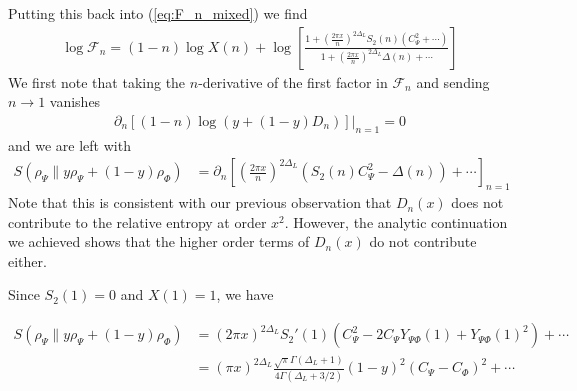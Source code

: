 \documentclass[11pt]{article}
\newcommand{\nn}{\nonumber}
\newcommand{\lb}{\left(}
\newcommand{\rb}{\right)}
\begin{document}
  Putting this back into (\ref{eq:F_n_mixed}) we find
    \begin{align}
    \log\mathcal{F}_{n}=(1-n)\log X(n)+\log\left[\frac{1+\lb \frac{2\pi x}{n}\rb^{2\Delta_L}S_{2}(n)\lb C_{\Psi}^{2}+\cdots\rb}{1+\lb \frac{2\pi x}{n}\rb^{2\Delta_L}\Delta(n)+\cdots}\right]
  \end{align}
  We first note that taking the $n$-derivative of the first factor in $\mathcal{F}
  _{n}$ and sending $n\to 1$ vanishes
  \begin{align}
    \partial_{n}\left[(1-n)\log(y+(1-y)D_{n})\right]\Big|_{n=1}=0
  \end{align}
  and we are left with
  \begin{align}
    S(\rho_\Psi\|y\rho_{\Psi}+(1-y)\rho_{\Phi}) & =\partial_{n}\left[\lb \frac{2\pi x}{n}\rb^{2\Delta_L}(S_{2}(n) C_\Psi^{2}-\Delta(n))+\cdots\right]_{n=1}
  \end{align}
Note that this is consistent with our previous observation that $D_n(x)$ does not contribute to the relative entropy at order $x^2$. However, the analytic continuation we achieved shows that the higher order terms of $D_n(x)$ do not contribute either.

  Since $S_{2}(1)=0$ and $X(1)=1$, we have

   \begin{align}
  S(\rho_{\Psi}\|y\rho_{\Psi}+(1-y)\rho_{\Phi}) & = (2\pi x)^{2\Delta_L}S_{2}'(1)(C_{\Psi}^{2}-2C_{\Psi}Y_{\Psi\Phi}(1)+Y_{\Psi\Phi}(1)^{2})+\cdots\nn                \\
   & =(\pi x)^{2\Delta_L}\frac{\sqrt{\pi}\Gamma(\Delta_{L}+1)}{4\Gamma(\Delta_{L}+3/2)}(1-y)^{2}(C_{\Psi}-C_{\Phi})^{2}+\cdots
  \end{align}
  
\end{document}
